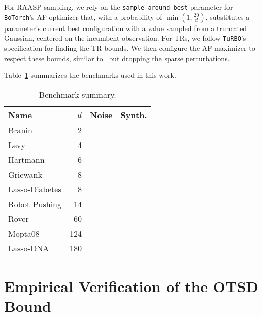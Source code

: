 \documentclass[accepted]{uai2025}
\newcommand{\cmark}{\ding{51}}%
\newcommand{\xmark}{\ding{55}}%
\begin{document}
For \ac{RAASP} sampling, we rely on the \texttt{sample\_around\_best} parameter for \texttt{BoTorch}'s \ac{AF} optimizer that, with a probability of $\min\left(1,\frac{20}{d}\right)$, substitutes a parameter's current best configuration with a value sampled from a truncated Gaussian, centered on the incumbent observation.
For \acp{TR}, we follow \texttt{TuRBO}'s specification for finding the \ac{TR} bounds.
We then configure the \ac{AF} maximizer to respect these bounds, similar to~\citet{TuRBO_BoTorch} but dropping the sparse perturbations. 

Table~\ref{tab:benchmark_summary} summarizes the benchmarks used in this work.

\begin{table}[tbh]
    \centering
    \begin{tabular}{lrcc}
        \toprule
         Name & $d$ & Noise & Synth. \\
         \midrule
         Branin & 2 & \xmark & \cmark \\
         Levy & 4 & \xmark & \cmark \\
         Hartmann & 6 & \xmark & \cmark \\
         Griewank & 8 & \xmark & \cmark\\%
         Lasso-Diabetes & 8 & \xmark & \xmark\\%
         Robot Pushing & 14 & \cmark & \xmark\\%
         Rover & 60 & \xmark & \xmark\\%
         Mopta08 & 124 & \xmark & \xmark\\%
         Lasso-DNA & 180 & \xmark & \xmark\\%
         \bottomrule
    \end{tabular}
    \caption{Benchmark summary.}
    \label{tab:benchmark_summary}
\end{table}


\section{Empirical Verification of the OTSD Bound}
\label{sec:empirical-otsd}
\end{document}
